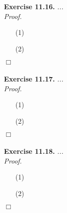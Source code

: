 \documentclass{article}
\begin{document}



\textbf{Exercise 11.16.}
\emph{...} \\

\emph{Proof.}
\begin{enumerate}
\item[(1)]
\item[(2)]

\end{enumerate}
$\Box$ \\\\






\textbf{Exercise 11.17.}
\emph{...} \\

\emph{Proof.}
\begin{enumerate}
\item[(1)]
\item[(2)]

\end{enumerate}
$\Box$ \\\\






\textbf{Exercise 11.18.}
\emph{...} \\

\emph{Proof.}
\begin{enumerate}
\item[(1)]
\item[(2)]

\end{enumerate}
$\Box$ \\\\



\end{document}
